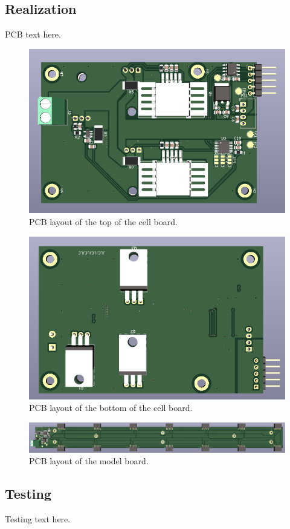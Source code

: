 \subsection{Realization}
PCB text here.

\begin{figure}[h]
    \centering
    \includegraphics[scale=0.5]{pcb_cell_board_top.png}
    \caption{PCB layout of the top of the cell board.}
\end{figure}

\begin{figure}[h]
    \centering
    \includegraphics[scale=0.5]{pcb_cell_board_bottom.png}
    \caption{PCB layout of the bottom of the cell board.}
\end{figure}

\begin{figure}[h]
    \centering
    \includegraphics[scale=0.27]{pcb_model_board_top.png}
    \caption{PCB layout of the model board.}
\end{figure}

\subsection{Testing}
Testing text here.
